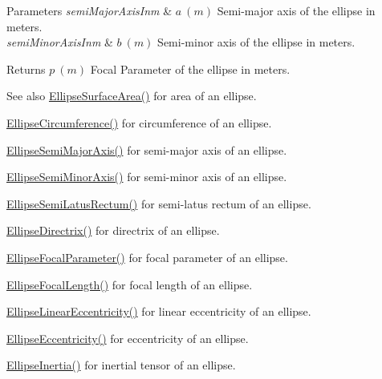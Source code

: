 \begin{DoxyParams}{Parameters}
{\em semi\+Major\+Axis\+Inm} & $ a\ (m)$ Semi-\/major axis of the ellipse in meters. \\
\hline
{\em semi\+Minor\+Axis\+Inm} & $ b\ (m)$ Semi-\/minor axis of the ellipse in meters. \\
\hline
\end{DoxyParams}
\begin{DoxyReturn}{Returns}
$ p\ (m)$ Focal Parameter of the ellipse in meters. 
\end{DoxyReturn}
\begin{DoxySeeAlso}{See also}
\mbox{\hyperlink{group___e_g_x_math-_geometry-2_d-_ellipse-_surface_area_ga4ce8c8323e9718ce5458f4ab7f6d823d}{Ellipse\+Surface\+Area()}} for area of an ellipse. 

\mbox{\hyperlink{group___e_g_x_math-_geometry-2_d-_ellipse-_circumference_ga4172802ac674eb53467b44928ac635c7}{Ellipse\+Circumference()}} for circumference of an ellipse. 

\mbox{\hyperlink{group___e_g_x_math-_geometry-2_d-_ellipse-_semi_major_axis_ga646a2ca065f4ac3f666a9ea22f3bb527}{Ellipse\+Semi\+Major\+Axis()}} for semi-\/major axis of an ellipse. 

\mbox{\hyperlink{group___e_g_x_math-_geometry-2_d-_ellipse-_semi_minor_axis_gae461acf3333565d69527dd86e9aa2b32}{Ellipse\+Semi\+Minor\+Axis()}} for semi-\/minor axis of an ellipse. 

\mbox{\hyperlink{group___e_g_x_math-_geometry-2_d-_ellipse-_semi_latus_rectum_gacfd1844eb4ef3d1ee3c0b460a6442ae6}{Ellipse\+Semi\+Latus\+Rectum()}} for semi-\/latus rectum of an ellipse. 

\mbox{\hyperlink{group___e_g_x_math-_geometry-2_d-_ellipse-_directrix_gace8f72a8efbc9c18d3eb689151405106}{Ellipse\+Directrix()}} for directrix of an ellipse. 

\mbox{\hyperlink{group___e_g_x_math-_geometry-2_d-_ellipse-_focal_parameter_ga4cd01a38c72c092ef9791351948bf69b}{Ellipse\+Focal\+Parameter()}} for focal parameter of an ellipse. 

\mbox{\hyperlink{group___e_g_x_math-_geometry-2_d-_ellipse-_focal_length_gab8d63de7640c880cfecaeada6f2afdac}{Ellipse\+Focal\+Length()}} for focal length of an ellipse. 

\mbox{\hyperlink{group___e_g_x_math-_geometry-2_d-_ellipse-_linear_eccentricity_gac70b3010e30aa8b73deb50fe2b9b9a91}{Ellipse\+Linear\+Eccentricity()}} for linear eccentricity of an ellipse. 

\mbox{\hyperlink{group___e_g_x_math-_geometry-2_d-_ellipse-_eccentricity_ga6a0a7fba17f782616894cfc447628c33}{Ellipse\+Eccentricity()}} for eccentricity of an ellipse. 

\mbox{\hyperlink{group___e_g_x_math-_geometry-2_d-_ellipse-_inertia_ga10a3049c2f04b50f271fb01dc62e4cf8}{Ellipse\+Inertia()}} for inertial tensor of an ellipse. 
\end{DoxySeeAlso}
